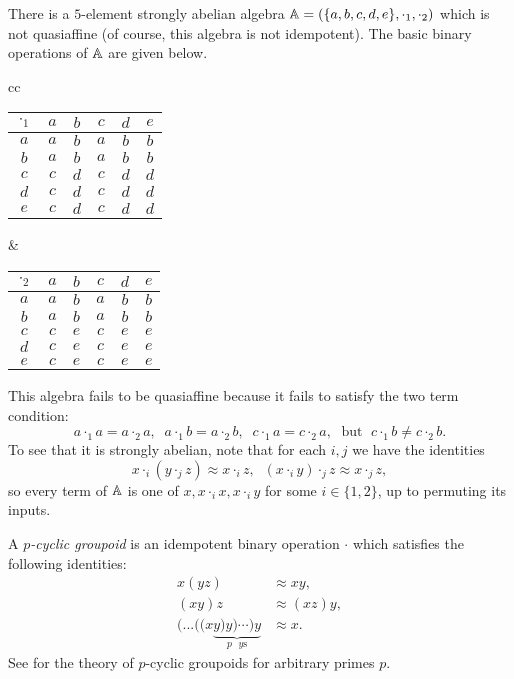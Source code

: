 \begin{appendices}
\begin{ex}\label{ex-strongly-abelian-not-quasiaffine} There is a $5$-element strongly abelian algebra $\mathbb{A} = (\{a,b,c,d,e\},\cdot_1,\cdot_2)$ which is not quasiaffine (of course, this algebra is not idempotent). The basic binary operations of $\mathbb{A}$ are given below.
\begin{center}
\begin{tabular}{cc}
\begin{tabular}{c | c c c c c} $\cdot_1$ & $a$ & $b$ & $c$ & $d$ & $e$\\ \hline $a$ & $a$ & $b$ & $a$ & $b$ & $b$\\ $b$ & $a$ & $b$ & $a$ & $b$ & $b$\\ $c$ & $c$ & $d$ & $c$ & $d$ & $d$\\ $d$ & $c$ & $d$ & $c$ & $d$ & $d$\\ $e$ & $c$ & $d$ & $c$ & $d$ & $d$ \end{tabular} &
\begin{tabular}{c | c c c c c} $\cdot_2$ & $a$ & $b$ & $c$ & $d$ & $e$\\ \hline $a$ & $a$ & $b$ & $a$ & $b$ & $b$\\ $b$ & $a$ & $b$ & $a$ & $b$ & $b$\\ $c$ & $c$ & $e$ & $c$ & $e$ & $e$\\ $d$ & $c$ & $e$ & $c$ & $e$ & $e$\\ $e$ & $c$ & $e$ & $c$ & $e$ & $e$ \end{tabular}
\end{tabular}
\end{center}
This algebra fails to be quasiaffine because it fails to satisfy the two term condition:
\[
a\cdot_1 a = a\cdot_2 a, \;\; a\cdot_1 b = a\cdot_2 b, \;\; c\cdot_1 a = c\cdot_2 a, \;\text{ but }\; c\cdot_1 b \ne c\cdot_2 b.
\]
To see that it is strongly abelian, note that for each $i,j$ we have the identities
\[
x\cdot_i (y\cdot_j z) \approx x\cdot_i z, \;\; (x\cdot_i y)\cdot_j z \approx x\cdot_j z,
\]
so every term of $\mathbb{A}$ is one of $x, x \cdot_i x, x \cdot_i y$ for some $i \in \{1,2\}$, up to permuting its inputs.
\end{ex}

\begin{ex} A \emph{$p$-cyclic groupoid} is an idempotent binary operation $\cdot$ which satisfies the following identities:
\begin{align*}
x(yz) &\approx xy,\\
(xy)z &\approx (xz)y,\\
(...((x\underbrace{y)y)\cdots) y}_{p\text{ }y\text{s}} &\approx x.
\end{align*}
See \cite{plonka-p-cyclic} for the theory of $p$-cyclic groupoids for arbitrary primes $p$.


\end{ex}
\end{appendices}
